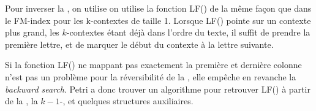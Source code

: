 Pour inverser la \kbwt, on utilise on utilise la fonction LF() de la même façon que dans le FM-index pour les k-contextes de taille 1. Lorsque LF() pointe sur un contexte plus grand, les $k$-contextes étant déjà dans l'ordre du texte, il suffit de prendre la première lettre, et de marquer le début du contexte à la lettre suivante.

Si la fonction LF() ne mappant pas exactement la première et dernière colonne n'est pas un problème pour la réversibilité de la \kbwt, elle empêche en revanche la \textit{backward search}. Petri a donc 
trouver un algorithme pour retrouver LF() à partir de la \kbwt, la $k-1$-\bwt, et quelques structures auxiliaires.


